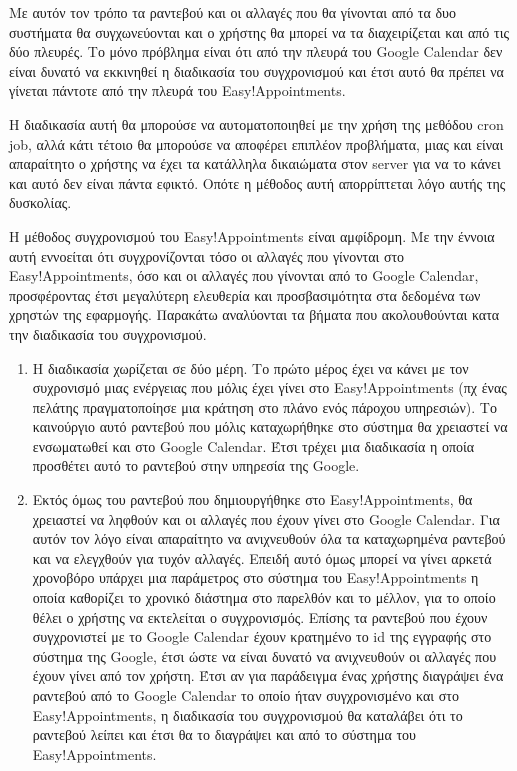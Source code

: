 Με αυτόν τον τρόπο τα ραντεβού και οι αλλαγές που θα γίνονται από τα δυο συστήματα θα συγχωνεύονται και ο χρήστης θα μπορεί να τα διαχειρίζεται και από τις δύο πλευρές. Το μόνο πρόβλημα είναι ότι από την πλευρά του Google Calendar δεν είναι δυνατό να εκκινηθεί η διαδικασία του συγχρονισμού και έτσι αυτό θα πρέπει να γίνεται πάντοτε από την πλευρά του Easy!Appointments. 

Η διαδικασία αυτή θα μπορούσε να αυτοματοποιηθεί με την χρήση της μεθόδου cron job, αλλά κάτι τέτοιο θα μπορούσε να αποφέρει επιπλέον προβλήματα, μιας και είναι απαραίτητο ο χρήστης να έχει τα κατάλληλα δικαιώματα στον server για να το κάνει και αυτό δεν είναι πάντα εφικτό. Οπότε η μέθοδος αυτή απορρίπτεται λόγο αυτής της δυσκολίας.

Η μέθοδος συγχρονισμού του Easy!Appointments είναι αμφίδρομη. Με την έννοια αυτή εννοείται ότι συγχρονίζονται τόσο οι αλλαγές που γίνονται στο Easy!Appointments, όσο και οι αλλαγές που γίνονται από το Google Calendar, προσφέροντας έτσι μεγαλύτερη ελευθερία και προσβασιμότητα στα δεδομένα των χρηστών της εφαρμογής. Παρακάτω αναλύονται τα βήματα που ακολουθούνται κατα την διαδικασία του συγχρονισμού.

\begin{enumerate}
\item Η διαδικασία χωρίζεται σε δύο μέρη. Το πρώτο μέρος έχει να κάνει με τον συχρονισμό μιας ενέργειας που μόλις έχει γίνει στο Easy!Appointments (πχ ένας πελάτης πραγματοποίησε μια κράτηση στο πλάνο ενός πάροχου υπηρεσιών). Το καινούργιο αυτό ραντεβού που μόλις καταχωρήθηκε στο σύστημα θα χρειαστεί να ενσωματωθεί και στο Google Calendar. Έτσι τρέχει μια διαδικασία η οποία προσθέτει αυτό το ραντεβού στην υπηρεσία της Google. 
\item Εκτός όμως του ραντεβού που δημιουργήθηκε στο Easy!Appointments, θα χρειαστεί να ληφθούν και οι αλλαγές που έχουν γίνει στο Google Calendar. Για αυτόν τον λόγο είναι απαραίτητο να ανιχνευθούν όλα τα καταχωρημένα ραντεβού και να ελεγχθούν για τυχόν αλλαγές. Επειδή αυτό όμως μπορεί να γίνει αρκετά χρονοβόρο υπάρχει μια παράμετρος στο σύστημα του Easy!Appointments η οποία καθορίζει το χρονικό διάστημα στο παρελθόν και το μέλλον, για το οποίο θέλει ο χρήστης να εκτελείται ο συγχρονισμός. Επίσης τα ραντεβού που έχουν συγχρονιστεί με το Google Calendar έχουν κρατημένο το id της εγγραφής στο σύστημα της Google, έτσι ώστε να είναι δυνατό να ανιχνευθούν οι αλλαγές που έχουν γίνει από τον χρήστη. Έτσι αν για παράδειγμα ένας χρήστης διαγράψει ένα ραντεβού από το Google Calendar το οποίο ήταν συγχρονισμένο και στο Easy!Appointments, η διαδικασία του συγχρονισμού θα καταλάβει ότι το ραντεβού λείπει και έτσι θα το διαγράψει και από το σύστημα του Easy!Appointments.
\end{enumerate}